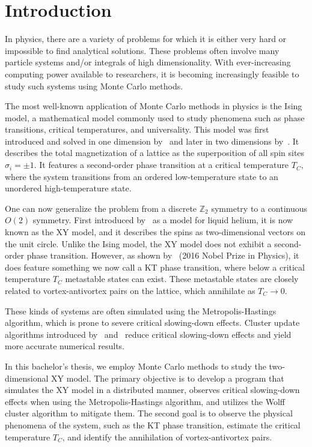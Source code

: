 \chapter{Introduction}\label{chap:introduction}
	In physics, there are a variety of problems for which it is either very hard or impossible to find analytical solutions. These problems often involve many particle systems and/or integrals of high dimensionality. With ever-increasing computing power available to researchers, it is becoming increasingly feasible to study such systems using Monte Carlo methods.
	
	The most well-known application of Monte Carlo methods in physics is the Ising model, a mathematical model commonly used to study phenomena such as phase transitions, critical temperatures, and universality. This model was first introduced and solved in one dimension by~\cite{ising} and later in two dimensions by~\cite{onsager}. It describes the total magnetization of a lattice as the superposition of all spin sites $\sigma_i = \pm 1$. It features a second-order phase transition at a critical temperature $T_C$, where the system transitions from an ordered low-temperature state to an unordered high-temperature state.
	
	One can now generalize the problem from a discrete $\mathbb{Z}_2$ symmetry to a continuous $O(2)$ symmetry. First introduced by~\cite{matsubara} as a model for liquid helium, it is now known as the XY model, and it describes the spins as two-dimensional vectors on the unit circle. Unlike the Ising model, the XY model does not exhibit a second-order phase transition. However, as shown by~\cite{kosterlitz} (2016 Nobel Prize in Physics), it does feature something we now call a KT phase transition, where below a critical temperature $T_C$ metastable states can exist. These metastable states are closely related to vortex-antivortex pairs on the lattice, which annihilate as $T_C \rightarrow 0$.
	
	These kinds of systems are often simulated using the Metropolis-Hastings algorithm, which is prone to severe critical slowing-down effects. Cluster update algorithms introduced by~\cite{sw} and~\cite{wolff} reduce critical slowing-down effects and yield more accurate numerical results.
	
	In this bachelor's thesis, we employ Monte Carlo methods to study the two-dimensional XY model. The primary objective is to develop a program that simulates the XY model in a distributed manner, observes critical slowing-down effects when using the Metropolis-Hastings algorithm, and utilizes the Wolff cluster algorithm to mitigate them. The second goal is to observe the physical phenomena of the system, such as the KT phase transition, estimate the critical temperature $T_C$, and identify the annihilation of vortex-antivortex pairs.
	